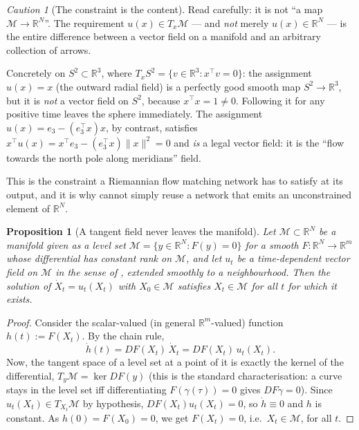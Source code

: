 \documentclass[11pt,a4paper]{report}
\newtheorem{proposition}[proposition]{Proposition}
\theoremstyle{definition}
\theoremstyle{remark}
\newtheorem{caution}[caution]{Caution}
\newcommand{\RR}{\mathbb R}
\begin{document}
\begin{caution}[The constraint is the content]
\label{caution:tangency-constraint}
Read  carefully: it is not ``a map
$\mathcal M\to\RR^N$''. The requirement $u(x)\in T_x\mathcal M$ --- and
\emph{not} merely $u(x)\in\RR^N$ --- is the entire difference between a
vector field on a manifold and an arbitrary collection of arrows.

Concretely on $S^2\subset\RR^3$, where
$T_xS^2=\{v\in\RR^3:x^\top v=0\}$: the assignment $u(x)=x$ (the outward
radial field) is a perfectly good smooth map $S^2\to\RR^3$, but it is
\emph{not} a vector field on $S^2$, because $x^\top x=1\ne0$. Following it
for any positive time leaves the sphere immediately. The assignment
$u(x)=e_3-\left(e_3^\top x\right)x$, by contrast, satisfies
$x^\top u(x)=x^\top e_3 - (e_3^\top x)\|x\|^2=0$ and \emph{is} a legal
vector field: it is the ``flow towards the north pole along meridians''
field.

This is the constraint a Riemannian flow matching network has to satisfy at
its output, and it is why  cannot simply reuse a
network that emits an unconstrained element of $\RR^N$.
\end{caution}

\begin{proposition}[A tangent field never leaves the manifold]
\label{prop:flow-stays-on-manifold}
Let $\mathcal M\subset\RR^N$ be a manifold given as a level set
$\mathcal M=\{y\in\RR^N: F(y)=0\}$ for a smooth $F:\RR^N\to\RR^m$ whose
differential has constant rank on $\mathcal M$, and let $u_t$ be a
time-dependent vector field on $\mathcal M$ in the sense of
, extended smoothly to a neighbourhood.
Then the solution of $\dot X_t=u_t(X_t)$ with $X_0\in\mathcal M$ satisfies
$X_t\in\mathcal M$ for all $t$ for which it exists.
\end{proposition}

\begin{proof}
Consider the scalar-valued (in general $\RR^m$-valued) function
$h(t) := F(X_t)$. By the chain rule,
\[
\dot h(t) = DF(X_t)\,\dot X_t = DF(X_t)\,u_t(X_t) .
\]
Now, the tangent space of a level set at a point of it is exactly the kernel
of the differential, $T_y\mathcal M=\ker DF(y)$ (this is the standard
characterisation: a curve stays in the level set iff differentiating
$F(\gamma(\tau))=0$ gives $DF\dot\gamma=0$). Since $u_t(X_t)\in T_{X_t}\mathcal M$
by hypothesis, $DF(X_t)u_t(X_t)=0$, so $\dot h\equiv0$ and $h$ is constant.
As $h(0)=F(X_0)=0$, we get $F(X_t)=0$, i.e.\ $X_t\in\mathcal M$, for all $t$.
\end{proof}
\end{document}
